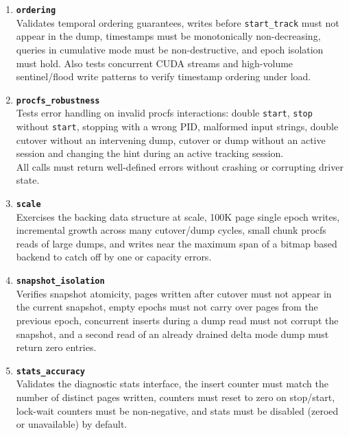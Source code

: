 \begin{enumerate}
    \item \textbf{\texttt{ordering}}
          \\Validates temporal ordering guarantees, writes before \texttt{start\_track}
          must not appear in the dump, timestamps must be monotonically
          non-decreasing, queries in cumulative mode must be non-destructive, and
          epoch isolation must hold.
          Also tests concurrent CUDA streams and high-volume sentinel/flood write
          patterns to verify timestamp ordering under load.\\

    \item \textbf{\texttt{procfs\_robustness}}
          \\Tests error handling on invalid procfs interactions: double \texttt{start},
          \texttt{stop} without \texttt{start}, stopping with a wrong PID,
          malformed input strings, double cutover without an intervening dump,
          cutover or dump without an active session and changing the hint during
          an active tracking session.\\
          All calls must return well-defined errors without crashing or corrupting
          driver state.\\

    \item \textbf{\texttt{scale}}
          \\Exercises the backing data structure at scale, 100K page single epoch
          writes, incremental growth across many cutover/dump cycles,
          small chunk procfs reads of large dumps, and writes
          near the maximum span of a bitmap based backend to catch off by one
          or capacity errors.\\

    \item \textbf{\texttt{snapshot\_isolation}}
          \\Verifies snapshot atomicity, pages written after cutover must not
          appear in the current snapshot, empty epochs must not carry over pages
          from the previous epoch, concurrent inserts during a dump read must not
          corrupt the snapshot, and a second read of an already drained delta mode
          dump must return zero entries.\\

    \item \textbf{\texttt{stats\_accuracy}}
          \\Validates the diagnostic stats interface, the insert counter must
          match the number of distinct pages written, counters must reset to zero
          on stop/start, lock-wait counters must be non-negative, and stats
          must be disabled (zeroed or unavailable) by default.\\


\end{enumerate}
